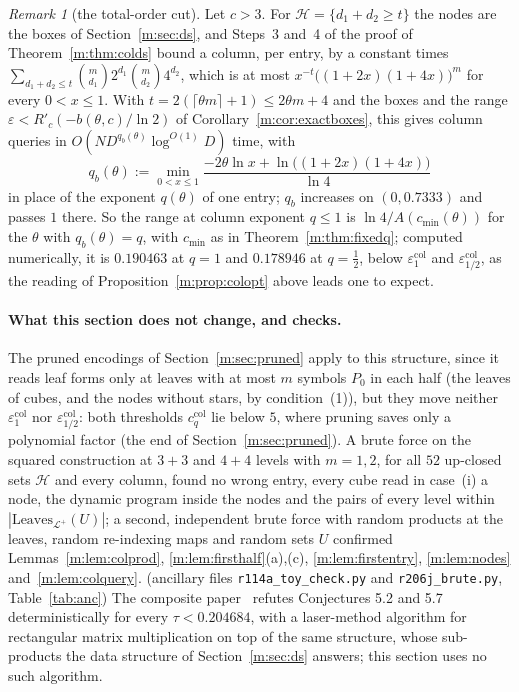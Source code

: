 \documentclass[11pt]{article}
\makeatletter
\theoremstyle{definition}
\theoremstyle{remark}
\newtheorem{remark}[theorem]{Remark}
\newcommand{\Leaves}{\mathrm{Leaves}}
\newcommand{\HintedOMvRthirtytwo}{0.204684}%
\newcommand{\ColTotalOrderOne}{0.190463}%
\newcommand{\ColTotalOrderHalf}{0.178946}%
\newcommand{\CPref}[1]{\ifcsname cpref@#1\endcsname\csname cpref@#1\endcsname\else\VTODO{label #1 of the other paper undefined}\fi}
\DeclareRobustCommand{\VTODO}[1]{{\color{red}\textbf{[TODO:} #1\textbf{]}}}
\makeatother
\begin{document}
\begin{remark}[the total-order cut]\label{m:rem:coltotal}
Let $c>3$. For $\mathcal H=\{d_1+d_2\ge t\}$ the nodes are the boxes of Section~\ref{m:sec:ds}, and Steps~3 and~4 of the proof of Theorem~\ref{m:thm:colds} bound a column, per entry, by a constant times $\sum_{d_1+d_2\le t}\binom m{d_1}2^{d_1}\binom m{d_2}4^{d_2}$, which is at most $x^{-t}\big((1+2x)(1+4x)\big)^m$ for every $0<x\le1$. With $t=2(\lceil\theta m\rceil+1)\le2\theta m+4$ and the boxes and the range $\varepsilon<R'_c(-b(\theta,c)/\ln2)$ of Corollary~\ref{m:cor:exactboxes}, this gives column queries in $O(ND^{q_b(\theta)}\log^{O(1)}\!D)$ time, with
\[
q_b(\theta):=\min_{0<x\le1}\frac{-2\theta\ln x+\ln\big((1+2x)(1+4x)\big)}{\ln4}
\]
in place of the exponent $q(\theta)$ of one entry; $q_b$ increases on $(0,0.7333)$ and passes $1$ there. So the range at column exponent $q\le1$ is $\ln4/A(c_{\min}(\theta))$ for the $\theta$ with $q_b(\theta)=q$, with $c_{\min}$ as in Theorem~\ref{m:thm:fixedq}; computed numerically, it is $\ColTotalOrderOne$ at $q=1$ and $\ColTotalOrderHalf$ at $q=\frac12$, below $\varepsilon^{\mathrm{col}}_1$ and $\varepsilon^{\mathrm{col}}_{1/2}$, as the reading of Proposition~\ref{m:prop:colopt} above leads one to expect.
\end{remark}

\paragraph{What this section does not change, and checks.} The pruned encodings of Section~\ref{m:sec:pruned} apply to this structure, since it reads leaf forms only at leaves with at most $m$ symbols $P_0$ in each half (the leaves of cubes, and the nodes without stars, by condition~(1)), but they move neither $\varepsilon^{\mathrm{col}}_1$ nor $\varepsilon^{\mathrm{col}}_{1/2}$: both thresholds $c^{\mathrm{col}}_q$ lie below $5$, where pruning saves only a polynomial factor (the end of Section~\ref{m:sec:pruned}). A brute force on the squared construction at $3+3$ and $4+4$ levels with $m=1,2$, for all $52$ up-closed sets $\mathcal H$ and every column, found no wrong entry, every cube read in case~(i) a node, the dynamic program inside the nodes and the pairs of every level within $|\Leaves_{\mathcal L^+}(U)|$; a second, independent brute force with random products at the leaves, random re-indexing maps and random sets $U$ confirmed Lemmas~\ref{m:lem:colprod}, \ref{m:lem:firsthalf}(a),(c), \ref{m:lem:firstentry}, \ref{m:lem:nodes} and~\ref{m:lem:colquery}. (ancillary files \texttt{r114a\_toy\_check.py} and \texttt{r206j\_brute.py}, Table~\ref{tab:anc}) The composite paper~\cite[Theorem~\CPref{cp:D5}]{CP} refutes Conjectures 5.2 and 5.7 deterministically for every $\tau<\HintedOMvRthirtytwo$, with a laser-method algorithm for rectangular matrix multiplication on top of the same structure, whose sub-products the data structure of Section~\ref{m:sec:ds} answers; this section uses no such algorithm.
\end{document}
